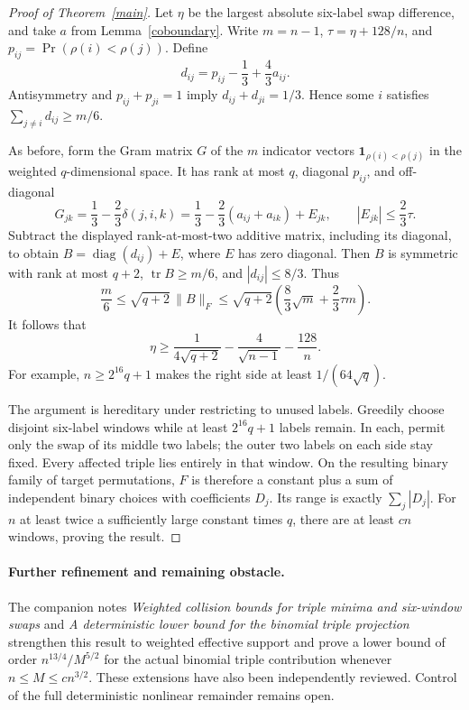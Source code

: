 \documentclass[11pt]{article}
\newcommand{\del}{\delta}
\begin{document}
\begin{proof}[Proof of Theorem~\ref{main}]
Let $\eta$ be the largest absolute six-label swap difference, and take
$a$ from Lemma~\ref{coboundary}. Write $m=n-1$,
$\tau=\eta+128/n$, and
$p_{ij}=\Pr(\rho(i)<\rho(j))$. Define
\[
 d_{ij}=p_{ij}-\frac13+\frac43a_{ij}.
\]
Antisymmetry and $p_{ij}+p_{ji}=1$ imply
$d_{ij}+d_{ji}=1/3$. Hence some $i$ satisfies
$\sum_{j\ne i}d_{ij}\ge m/6$.

As before, form the Gram matrix $G$ of the $m$ indicator vectors
$\mathbf1_{\rho(i)<\rho(j)}$ in the weighted $q$-dimensional space.
It has rank at most $q$, diagonal $p_{ij}$, and off-diagonal
\[
 G_{jk}=\frac13-\frac23\del(j,i,k)
       =\frac13-\frac23(a_{ij}+a_{ik})+E_{jk},
 \qquad |E_{jk}|\le\frac23\tau.
\]
Subtract the displayed rank-at-most-two additive matrix, including its
diagonal, to obtain $B=\operatorname{diag}(d_{ij})+E$, where $E$ has
zero diagonal. Then $B$ is symmetric with rank at most $q+2$,
$\operatorname{tr}B\ge m/6$, and $|d_{ij}|\le8/3$. Thus
\[
 \frac m6\le\sqrt{q+2}\,\|B\|_F
 \le\sqrt{q+2}\left(\frac83\sqrt m+\frac23\tau m\right).
\]
It follows that
\[
 \eta\ge\frac1{4\sqrt{q+2}}-\frac4{\sqrt{n-1}}-\frac{128}{n}.
\]
For example, $n\ge2^{16}q+1$ makes the right side at least
$1/(64\sqrt q)$.

The argument is hereditary under restricting to unused labels. Greedily
choose disjoint six-label windows while at least $2^{16}q+1$ labels
remain. In each, permit only the swap of its middle two labels; the
outer two labels on each side stay fixed. Every affected triple lies
entirely in that window. On the resulting binary family of target
permutations, $F$ is therefore a constant plus a sum of independent
binary choices with coefficients $D_j$. Its range is exactly
$\sum_j|D_j|$. For $n$ at least twice a sufficiently large constant
times $q$, there are at least $c n$ windows, proving the result.
\end{proof}

\paragraph{Further refinement and remaining obstacle.}
The companion notes \emph{Weighted collision bounds for triple minima
and six-window swaps} and \emph{A deterministic lower bound for the
binomial triple projection} strengthen this result to weighted effective
support and prove a lower bound of order $n^{13/4}/M^{5/2}$ for the
actual binomial triple contribution whenever $n\le M\le c n^{3/2}$.
These extensions have also been independently reviewed. Control of the
full deterministic nonlinear remainder remains open.
\end{document}
